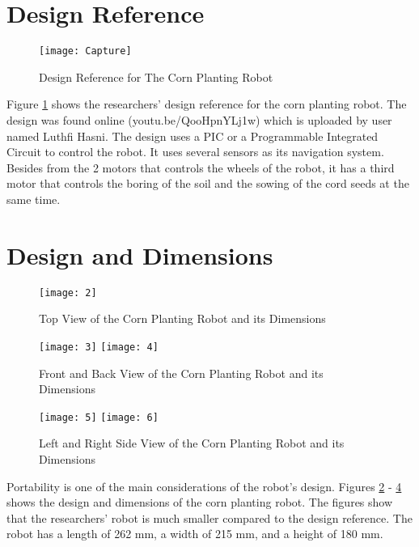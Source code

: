 \section{Design Reference}

\begin{figure}[!htbp]
	\centering
		\texttt{[image: Capture]}
	\caption{Design Reference for The Corn Planting Robot}
	\label{fig:reference}
\end{figure}

Figure \ref{fig:reference} shows the researchers’ design reference for the corn planting robot. The design was found online (youtu.be/QooHpnYLj1w) which is uploaded by user named Luthfi Hasni. The design uses a PIC or a Programmable Integrated Circuit to control the robot. It uses several sensors as its navigation system. Besides from the 2 motors that controls the wheels of the robot, it has a third motor that controls the boring of the soil and the sowing of the cord seeds at the same time. 

\section{Design and Dimensions}

\begin{figure}[!htbp]
	\centering
		\texttt{[image: 2]}
	\caption{Top View of the Corn Planting Robot and its Dimensions}
	\label{fig:1}
\end{figure}

\begin{figure}[!htbp]
	\centering
		\texttt{[image: 3]}
		\texttt{[image: 4]}
	\caption{Front and Back View of the Corn Planting Robot and its Dimensions}
	\label{fig:2}
\end{figure}

\begin{figure}[!htbp]
	\centering
		\texttt{[image: 5]}
		\texttt{[image: 6]}
	\caption{Left and Right Side View of the Corn Planting Robot and its Dimensions}
	\label{fig:3}
\end{figure}

Portability is one of the main considerations of the robot’s design. Figures \ref{fig:1} - \ref{fig:3} shows the design and dimensions of the corn planting robot. The figures show that the researchers’ robot is much smaller compared to the design reference. The robot has a length of 262 mm, a width of 215 mm, and a height of 180 mm.

